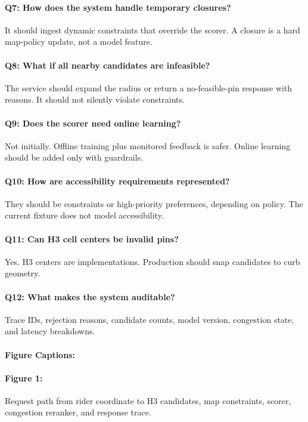 \documentclass{article}
\begin{document}
\paragraph{Q7: How does the system handle temporary closures?}
It should ingest dynamic constraints that override the scorer. A closure is a hard map-policy update, not a model feature.

\paragraph{Q8: What if all nearby candidates are infeasible?}
The service should expand the radius or return a no-feasible-pin response with reasons. It should not silently violate constraints.

\paragraph{Q9: Does the scorer need online learning?}
Not initially. Offline training plus monitored feedback is safer. Online learning should be added only with guardrails.

\paragraph{Q10: How are accessibility requirements represented?}
They should be constraints or high-priority preferences, depending on policy. The current fixture does not model accessibility.

\paragraph{Q11: Can H3 cell centers be invalid pins?}
Yes. H3 centers are implementations. Production should snap candidates to curb geometry.

\paragraph{Q12: What makes the system auditable?}
Trace IDs, rejection reasons, candidate counts, model version, congestion state, and latency breakdowns.

\paragraph{Figure Captions:}

\paragraph{Figure 1:}
Request path from rider coordinate to H3 candidates, map constraints, scorer, congestion reranker, and response trace.
\end{document}

